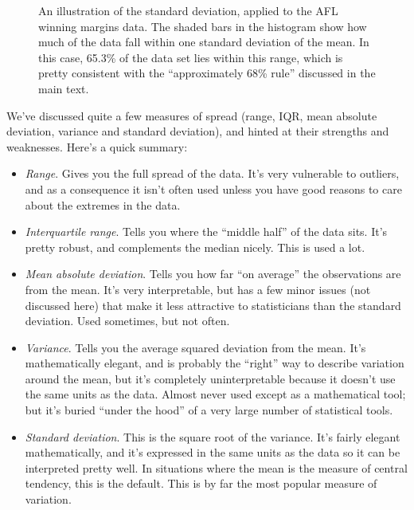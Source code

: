 \begin{figure}[ht]
\begin{center}
\caption{An illustration of the standard deviation, applied to the AFL winning margins data. The shaded bars in the histogram show how much of the data fall within one standard deviation of the mean. In this case, 65.3\% of the data set lies within this range, which is pretty consistent with the ``approximately 68\% rule'' discussed in the main text.}
\label{fig:aflsd}
\HR
\end{center}
\end{figure}


We've discussed quite a few measures of spread (range, IQR, mean absolute deviation, variance and standard deviation), and hinted at their strengths and weaknesses. Here's a quick summary:

\begin{itemize}
\item {\it Range}. Gives you the full spread of the data. It's very vulnerable to outliers, and as a consequence it isn't often used unless you have good reasons to care about the extremes in the data.
\item {\it Interquartile range}. Tells you where the ``middle half'' of the data sits. It's pretty robust, and complements the median nicely. This is used a lot.
\item {\it Mean absolute deviation}. Tells you how far ``on average'' the observations are from the mean. It's very interpretable, but has a few minor issues (not discussed here) that make it less attractive to statisticians than the standard deviation. Used sometimes, but not often.
\item {\it Variance}. Tells you the average squared deviation from the mean. It's mathematically elegant, and is probably the ``right'' way to describe variation around the mean, but it's completely uninterpretable because it doesn't use the same units as the data. Almost never used except as a mathematical tool; but it's buried ``under the hood'' of a very large number of statistical tools.
\item {\it Standard deviation}. This is the square root of the variance. It's fairly elegant mathematically, and it's expressed in the same units as the data so it can be interpreted pretty well. In situations where the mean is the measure of central tendency, this is the default. This is by far the most popular measure of variation. 
\end{itemize}

